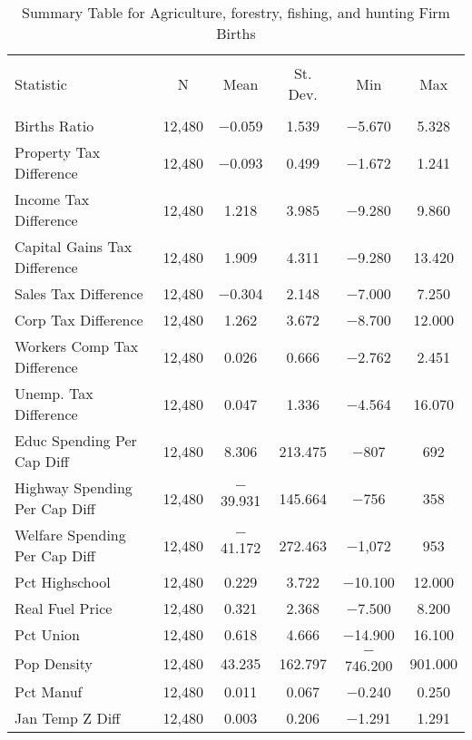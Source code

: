 
\begin{table}[!htbp] \centering 
  \caption{Summary Table for  Agriculture, forestry, fishing, and hunting Firm Births} 
  \label{11summary} 
\begin{tabular}{@{\extracolsep{5pt}}lccccc} 
\\[-1.8ex]\hline 
\hline \\[-1.8ex] 
Statistic & \multicolumn{1}{c}{N} & \multicolumn{1}{c}{Mean} & \multicolumn{1}{c}{St. Dev.} & \multicolumn{1}{c}{Min} & \multicolumn{1}{c}{Max} \\ 
\hline \\[-1.8ex] 
Births Ratio & 12,480 & $-$0.059 & 1.539 & $-$5.670 & 5.328 \\ 
Property Tax Difference & 12,480 & $-$0.093 & 0.499 & $-$1.672 & 1.241 \\ 
Income Tax Difference & 12,480 & 1.218 & 3.985 & $-$9.280 & 9.860 \\ 
Capital Gains Tax Difference & 12,480 & 1.909 & 4.311 & $-$9.280 & 13.420 \\ 
Sales Tax Difference & 12,480 & $-$0.304 & 2.148 & $-$7.000 & 7.250 \\ 
Corp Tax Difference & 12,480 & 1.262 & 3.672 & $-$8.700 & 12.000 \\ 
Workers Comp Tax Difference & 12,480 & 0.026 & 0.666 & $-$2.762 & 2.451 \\ 
Unemp. Tax Difference & 12,480 & 0.047 & 1.336 & $-$4.564 & 16.070 \\ 
Educ Spending Per Cap Diff & 12,480 & 8.306 & 213.475 & $-$807 & 692 \\ 
Highway Spending Per Cap Diff & 12,480 & $-$39.931 & 145.664 & $-$756 & 358 \\ 
Welfare Spending Per Cap Diff & 12,480 & $-$41.172 & 272.463 & $-$1,072 & 953 \\ 
Pct Highschool & 12,480 & 0.229 & 3.722 & $-$10.100 & 12.000 \\ 
Real Fuel Price & 12,480 & 0.321 & 2.368 & $-$7.500 & 8.200 \\ 
Pct Union & 12,480 & 0.618 & 4.666 & $-$14.900 & 16.100 \\ 
Pop Density & 12,480 & 43.235 & 162.797 & $-$746.200 & 901.000 \\ 
Pct Manuf & 12,480 & 0.011 & 0.067 & $-$0.240 & 0.250 \\ 
Jan Temp Z Diff & 12,480 & 0.003 & 0.206 & $-$1.291 & 1.291 \\ 

\end{tabular}
\end{table}
